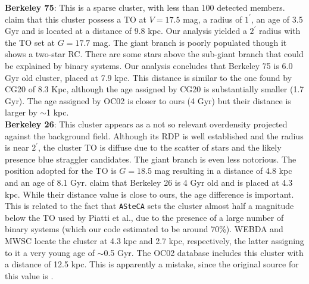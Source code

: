 \documentclass[draft]{aa}
\begin{document}
  \textbf{Berkeley 75}: This is a sparse cluster, with less than 100 detected
  members. \cite{Carraro_2005} claim that this cluster possess
  a TO at $V= 17.5$ mag, a radius of $1^{\prime}$, an age of 3.5 Gyr and is
  located at a distance of 9.8 kpc.
  Our analysis yielded a $2^{\prime}$ radius with the TO set at $G=17.7$ mag.
  The giant branch is poorly populated though it shows a two-star RC.
  There are some stars above the sub-giant branch that could be explained
  by binary systems. Our analysis concludes that Berkeley 75 is 6.0 Gyr old
  cluster, placed at 7.9 kpc. This distance is similar to the one found by CG20
  of 8.3 Kpc, although the age assigned by CG20 is substantially smaller (1.7
  Gyr). The age assigned by OC02 is closer to ours (4 Gyr) but their distance is
  larger by $\sim$1 kpc.\\

  \textbf{Berkeley 26}: This cluster appears as a not so relevant overdensity
  projected against the background field. Although its RDP is well established
  and the radius is near $2^{\prime}$, the cluster TO is diffuse due to the
  scatter of stars and the likely presence blue straggler candidates. The
  giant branch is even less notorious.
  The position adopted for the TO is $G=18.5$ mag resulting in a distance of 4.8
  kpc and an age of 8.1 Gyr. \cite{Piatti_2010} claim that Berkeley 26 is 4 Gyr
  old and is placed at 4.3 kpc. While their distance value is close to ours, the
  age difference is important. This is related to the fact that \texttt{ASteCA}
  sets the cluster almost half a magnitude below the TO used by Piatti et al.,
  due to the presence of a large number of binary systems (which our code
  estimated to be around 70\%).
  WEBDA and MWSC locate the cluster at 4.3 kpc and 2.7 kpc, respectively, the
  latter assigning to it a very young age of $\sim$0.5 Gyr. The OC02 database
  includes this cluster with a distance of 12.5 kpc. This is apparently
  a mistake, since the original source for this value is \cite{Piatti_2010}.\\
\end{document}

